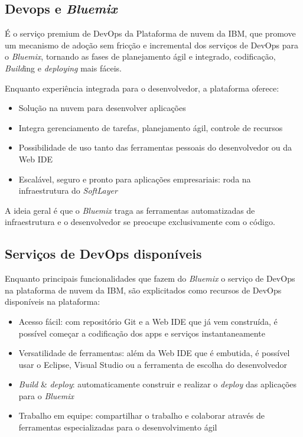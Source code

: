 \subsection{Devops e \textit{Bluemix}}
É o serviço premium de DevOps da Plataforma de nuvem da IBM, que promove um mecanismo de adoção sem fricção e incremental dos serviços de DevOps para o \textit{Bluemix}, tornando as fases de planejamento ágil e integrado, codificação, \textit{Build}ing e \textit{deploying} mais fáceis.

Enquanto experiência integrada para o desenvolvedor, a plataforma oferece:
\begin{itemize}
    \item Solução na nuvem para desenvolver aplicações
    \item Integra gerenciamento de tarefas, planejamento ágil, controle de recursos
    \item Possibilidade de uso tanto das ferramentas pessoais do desenvolvedor ou da Web IDE
    \item Escalável, seguro e pronto para aplicações empresariais: roda na infraestrutura do \textit{SoftLayer}
\end{itemize}

A ideia geral é que o \textit{Bluemix} traga as ferramentas automatizadas de infraestrutura e o desenvolvedor se preocupe exclusivamente com o código.

\subsection{Serviços de DevOps disponíveis}

Enquanto principais funcionalidades que fazem do \textit{Bluemix} o serviço de DevOps na plataforma de nuvem da IBM, são explicitados como recursos de DevOps disponíveis na plataforma:
\begin{itemize}
    \item Acesso fácil: com repositório Git e a Web IDE que já vem construída, é possível começar a codificação dos apps e serviços instantaneamente
    \item Versatilidade de ferramentas: além da Web IDE que é embutida, é possível usar o Eclipse, Visual Studio ou a ferramenta de escolha do desenvolvedor
    \item \textit{Build} & \textit{deploy}: automaticamente construir e realizar o \textit{deploy} das aplicações para o \textit{Bluemix}
    \item Trabalho em equipe: compartilhar o trabalho e colaborar através de ferramentas especializadas para o desenvolvimento ágil
\end{itemize}

